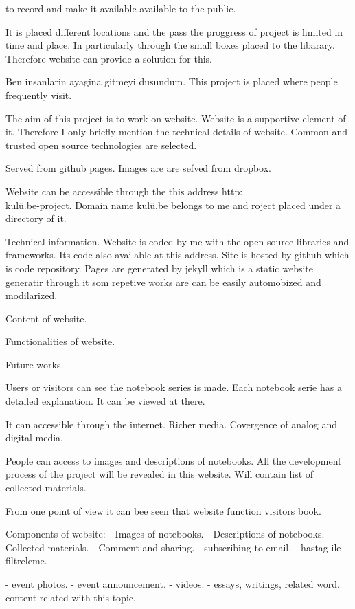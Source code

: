 {to record and make it available available to the public.

It is placed different locations and the pass the proggress of project is limited in time and place. In particularly through the small boxes placed to the libarary. Therefore website can provide a solution for this.

Ben insanlarin ayagina gitmeyi dusundum. This project is placed where people frequently visit.

The aim of this project is to work on website. Website is a supportive element of it. Therefore I only briefly mention the technical details of website. Common and trusted open source technologies are selected.

Served from github pages. Images are are sefved from dropbox. 

Website can be accessible through the this address http:\\kulü.be\notebook-project. Domain name kulü.be belongs to me and roject placed under a directory of it.

Technical information. Website is coded by me with the open source libraries and frameworks. Its code also available at this address. Site is hosted by github which is code repository. Pages are generated by jekyll which is a static website generatir through it som repetive works are can be easily automobized and modilarized. 

Content of website.

Functionalities of website.

Future works.

Users or visitors can see the notebook series is made. Each notebook serie has a detailed explanation. It can be viewed at there.

It can accessible through the internet. Richer media. Covergence of analog and digital media.

People can access to images and descriptions of notebooks. All the development process of the project will be revealed in this website. Will contain list of collected materials. 

From one point of view it can bee seen that website function visitors book.

Components of website:
- Images of notebooks. 
- Descriptions of notebooks.
- Collected materials.
- Comment and sharing.
- subscribing to email.
- hastag ile filtreleme.

- event photos.
- event announcement.
- videos.
- essays, writings, related word. content related with this topic.

}
